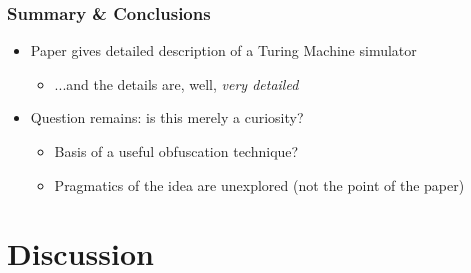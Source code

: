\documentclass{beamer}
\begin{document}
\begin{frame}[fragile]
\frametitle{Summary \& Conclusions}

\begin{itemize}
\item Paper gives detailed description of a Turing Machine simulator
\pause
\begin{itemize}
\item ...and the details are, well, \emph{very detailed}
\end{itemize}
\pause
\item Question remains: is this merely a curiosity?
\begin{itemize}
\item Basis of a useful obfuscation technique?
\item Pragmatics of the idea are unexplored (not the point of the paper)
\end{itemize}
\end{itemize}
\end{frame}
\section{Discussion}

%
\end{document}
